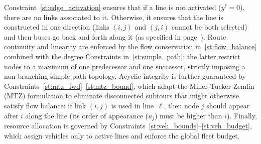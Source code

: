 \documentclass[a4paper,fleqn]{cas-sc}
\begin{document}
%
Constraint~\eqref{st:edge_activation} ensures that if a line is not activated ($y^\ell=0$), there are no links associated to it. Otherwise, it ensures that the line is constructed in one direction (links $(i,j)$ and $(j,i)$ cannot be both selected) and then buses go back and forth along it (as specified in page~\pageref{sentence:line-in-one-direction}).
%
%
%
Route continuity and linearity are enforced by the flow conservation in~\eqref{st:flow_balance} combined with the degree Constraints in~\eqref{st:simple_path}; the latter restrict nodes to a maximum of one predecessor and one successor, strictly imposing a non-branching simple path topology. 
%
Acyclic integrity is further guaranteed by Constraints~\eqref{st:mtz_fwd}--\eqref{st:mtz_bound}, which adapt the Miller-Tucker-Zemlin (MTZ) formulation to eliminate disconnected subtours that might otherwise satisfy flow balance: if link $(i,j)$ is used in line~$\ell$, then node $j$ should appear after $i$ along the line (its order of appearance ($u_j$) must be higher than $i$).
%
Finally, resource allocation is governed by Constraints~\eqref{st:veh_bounds}--\eqref{st:veh_budget}, which assign vehicles only to active lines and enforce the global fleet budget.
%
\end{document}
